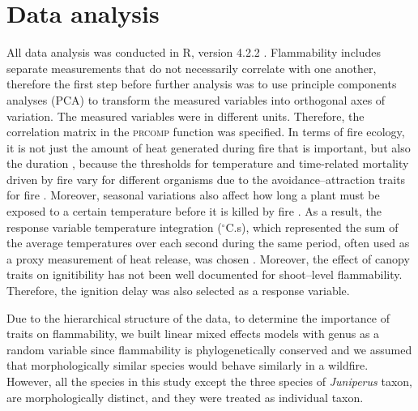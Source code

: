 \documentclass{ttuthes2007}
\newcommand{\pkg}[1]{\textsc{#1}}
\begin{document}
\section*{\textbf{Data analysis}}

\noindent All data analysis was conducted in R, version 4.2.2 \citep{R}. 
Flammability includes separate measurements that do not necessarily correlate with one another, therefore the first step before further analysis was to use principle components analyses (PCA) to transform the measured variables into orthogonal axes of variation. The measured variables were in different units. Therefore, the correlation matrix in the \pkg{prcomp} function was specified. In terms of fire ecology, it is not just the amount of heat generated during fire that is important, but also the duration \citep{mcgranahan2020inconvenient}, because the thresholds for temperature and time-related mortality driven by fire vary for different organisms \citep{nelson1952observations,vines1968heat, bond1983dead, hengst1994bark,pinard1997fire,lawes2011bark, pingree2019myth} due to the avoidance–attraction traits for fire \citep{schwilk2001flammability, archibald2019unified}. Moreover, seasonal variations also affect how long a plant must be exposed to a certain temperature before it is killed by fire \citep{wright1970method}. As a result, the response variable temperature integration ($^{\circ}$C.s), which represented the sum of the average temperatures over each second during the same period, often used as a proxy measurement of heat release, was chosen \citep{gao2018grass, mcgranahan2020inconvenient}. Moreover, the effect of canopy traits on ignitibility has not been well documented for shoot--level flammability. Therefore, the ignition delay was also selected as a response variable.

\noindent Due to the hierarchical structure of the data, to determine the importance of traits on flammability, we built linear mixed effects models with genus as a random variable since flammability is phylogenetically conserved \citep{cui2020shoot} and we assumed that morphologically similar species would behave similarly in a wildfire. However, all the species in this study except the three species of \emph{Juniperus} taxon,
are morphologically distinct, and they were treated as individual taxon. 
\end{document}
